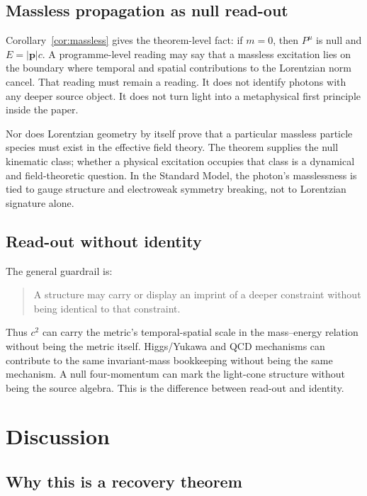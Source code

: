 \documentclass[12pt,a4paper]{article}
\theoremstyle{definition}
\theoremstyle{remark}
\begin{document}
\subsection{Massless propagation as null read-out}

Corollary~\ref{cor:massless} gives the theorem-level fact: if $m=0$, then $P^\mu$ is null and $E=|\mathbf p|c$. A programme-level reading may say that a massless excitation lies on the boundary where temporal and spatial contributions to the Lorentzian norm cancel. That reading must remain a reading. It does not identify photons with any deeper source object. It does not turn light into a metaphysical first principle inside the paper.

Nor does Lorentzian geometry by itself prove that a particular massless particle species must exist in the effective field theory. The theorem supplies the null kinematic class; whether a physical excitation occupies that class is a dynamical and field-theoretic question. In the Standard Model, the photon's masslessness is tied to gauge structure and electroweak symmetry breaking, not to Lorentzian signature alone.

\subsection{Read-out without identity}

The general guardrail is:

\begin{quote}
A structure may carry or display an imprint of a deeper constraint without being identical to that constraint.
\end{quote}

Thus $c^2$ can carry the metric's temporal-spatial scale in the mass--energy relation without being the metric itself. Higgs/Yukawa and QCD mechanisms can contribute to the same invariant-mass bookkeeping without being the same mechanism. A null four-momentum can mark the light-cone structure without being the source algebra. This is the difference between read-out and identity.

\section{Discussion}
\label{sec:discussion}

\subsection{Why this is a recovery theorem}
\end{document}
